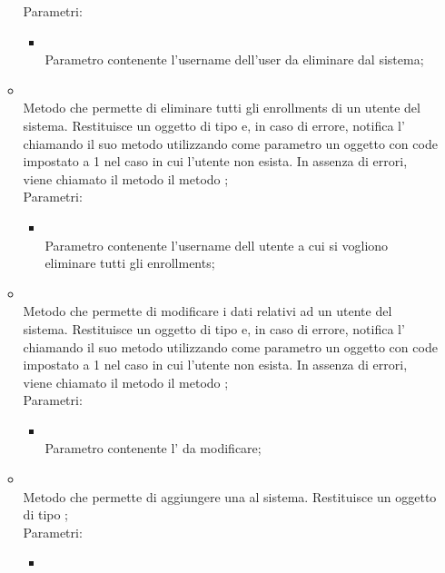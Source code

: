 \begin{itemize}
\begin{itemize}
		Parametri:
		\begin{itemize}
			\item {} \\
			Parametro contenente l'username dell'user da eliminare dal sistema;
		\end{itemize}
		\item[]  \\		Metodo che permette di eliminare tutti gli enrollments di un utente del sistema. Restituisce un oggetto di tipo  e, in caso di errore, notifica l' chiamando il suo metodo  utilizzando come parametro un oggetto  con code impostato a 1 nel caso in cui l'utente non esista. In assenza di errori, viene chiamato il metodo il metodo ;\\
		Parametri:
		\begin{itemize}
			\item {} \\
			Parametro contenente l'username dell utente a cui si vogliono eliminare tutti gli enrollments;
		\end{itemize}
		\item[]  \\		Metodo che permette di modificare i dati relativi ad un utente del sistema. Restituisce un oggetto di tipo  e, in caso di errore, notifica l' chiamando il suo metodo  utilizzando come parametro un oggetto  con code impostato a 1 nel caso in cui l'utente non esista. In assenza di errori, viene chiamato il metodo il metodo ;\\
		Parametri:
		\begin{itemize}
			\item {} \\
			Parametro contenente l' da modificare;
		\end{itemize}
		\item[]  \\		Metodo che permette di aggiungere una  al sistema. Restituisce un oggetto di tipo ;\\
		Parametri:
		\begin{itemize}
			\item {} \\

\end{itemize}
\end{itemize}
\end{itemize}
